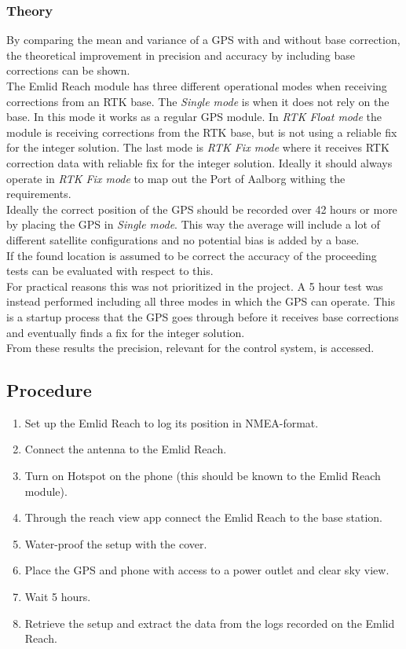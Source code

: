 \subsubsection*{Theory}
By comparing the mean and variance of a GPS with and without base correction, the theoretical improvement in precision and accuracy by including base corrections can be shown.\\
The Emlid Reach module has three different operational modes when receiving corrections from an RTK base. The \emph{Single mode} is when it does not rely on the base. In this mode it works as a regular GPS module. In \emph{RTK Float mode} the module is receiving corrections from the RTK base, but is not using a reliable fix for the integer solution. The last mode is \emph{RTK Fix mode} where it receives RTK correction data with reliable fix for the integer solution. Ideally it should always operate in \emph{RTK Fix mode} to map out the Port of Aalborg withing the requirements.\\
Ideally the correct position of the GPS should be recorded over 42 hours or more by placing the GPS in \emph{Single mode}. This way the average will include a lot of different satellite configurations and no potential bias is added by a base.\\
If the found location is assumed to be correct the accuracy of the proceeding tests can be evaluated with respect to this.\\
For practical reasons this was not prioritized in the project. A 5 hour test was instead performed including all three modes in which the GPS can operate. This is a startup process that the GPS goes through before it receives base corrections and eventually finds a fix for the integer solution.\\
From these results the precision, relevant for the control system, is accessed.

\subsection*{Procedure}
\begin{enumerate}
  \item Set up the Emlid Reach to log its position in NMEA-format.
  \item Connect the antenna to the Emlid Reach.
	\item Turn on Hotspot on the phone (this should be known to the Emlid Reach module).
	\item Through the reach view app connect the Emlid Reach to the base station.
	\item Water-proof the setup with the cover.
	\item Place the GPS and phone with access to a power outlet and clear sky view.
	\item Wait 5 hours.
	\item Retrieve the setup and extract the data from the logs recorded on the Emlid Reach.
\end{enumerate}


